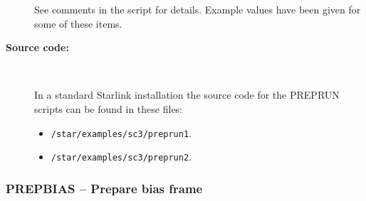 \documentclass[twoside,11pt]{starlink}
\providecommand{\scspec}[2]{#1}
\begin{document}
\begin{description}
\begin{enumerate}
\end{enumerate}

     See comments in the script for details.  Example values
     have been given for some of these items.

\item [\textbf{Source code:}] \mbox{} \\
\begin{latexonly}
In a standard Starlink installation the source code for the PREPRUN scripts
can be found in these files:
\begin{itemize}

\item \texttt{/star/examples/sc3/preprun1}.

\item \texttt{/star/examples/sc3/preprun2}.

\end{itemize}
\end{latexonly}



\end{description}

\newpage
\subsubsection{\label{se_prepbias}PREPBIAS
               \scspec{--}{-} Prepare bias frame}
\end{document}
